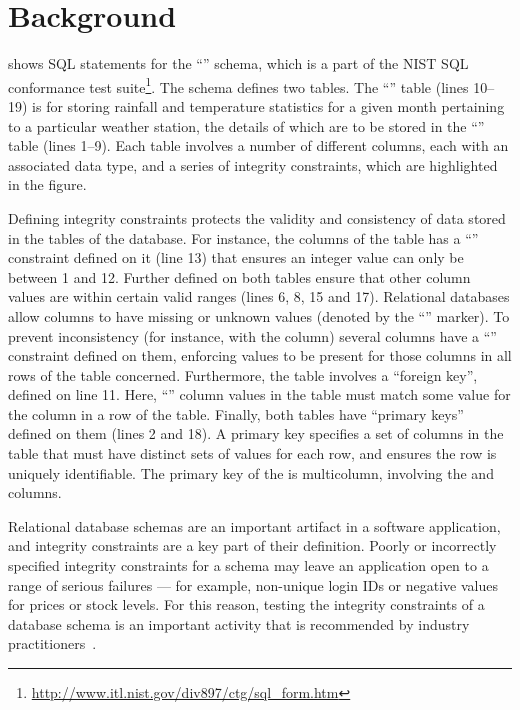 
\section{Background}
\label{sec:background}



 shows SQL  statements for the ``\NistWeather'' schema, which is a part of the NIST SQL conformance test suite\footnote{\url{http://www.itl.nist.gov/div897/ctg/sql_form.htm}}. The schema defines two tables. The ``'' table (lines 10--19) is for storing rainfall and temperature statistics for a given month pertaining to a particular weather station, the details of which are to be  stored in the ``'' table (lines 1--9). Each table involves a number of different columns, each with an associated data type, and a series of integrity constraints, which are highlighted in the figure. 

Defining integrity constraints protects the validity and consistency of data stored in the tables of the database. For instance, the  columns of the  table has a ``\CHECK'' constraint defined on it (line 13) that ensures an integer  value can only be between 1 and 12. Further \CCs defined on both tables ensure that other column values are within certain valid ranges (lines 6, 8, 15 and 17). Relational databases allow columns to have missing or unknown values (denoted by the ``\NULL'' marker). To prevent inconsistency (for instance, with the  column) several columns have a ``\NOTNULL'' constraint defined on them, enforcing values to be present for those columns in all rows of the table concerned.
Furthermore, the  table involves a ``foreign key'', defined on line 11. Here, ``'' column values in the  table must match some value 
for the  column in a row of the  table. Finally, both tables have ``primary keys'' defined on them (lines 2 and 18). A primary key specifies a set of columns in the table that must have distinct sets of values for each row, and ensures the row is uniquely identifiable. 
The primary key of the  is multicolumn, involving the  and  columns.

Relational database schemas are an important artifact in a software application, and integrity constraints are a key part of their definition. Poorly or incorrectly specified integrity constraints for a schema may leave an application open to a range of serious failures --- for example, non-unique login IDs or negative values for prices or stock levels. For this reason, testing the integrity constraints of a database schema is an important activity that is recommended by industry practitioners~\cite{DzoneDatabaseTesting}.

